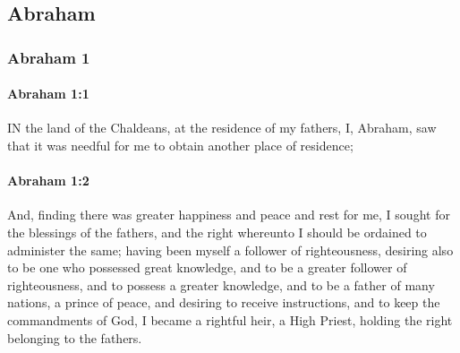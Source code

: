 \subsection{Abraham}
	\label{ABRAHAM}
	
	\subsubsection{Abraham 1} %
		\label{ABRAHAM-1}
		
		\paragraph{Abraham 1:1} %
			\label{ABRAHAM-1-1}

			IN the land of the Chaldeans, at the residence of my fathers, I, Abraham, saw that it was needful for me to obtain another place of residence;


		\paragraph{Abraham 1:2} %
			\label{ABRAHAM-1-2}

			And, finding there was greater happiness and peace and rest for me, I sought for the blessings of the fathers, and the right whereunto I should be ordained to administer the same; having been myself a follower of righteousness, desiring also to be one who possessed great knowledge, and to be a greater follower of righteousness, and to possess a greater knowledge, and to be a father of many nations, a prince of peace, and desiring to receive instructions, and to keep the commandments of God, I became a rightful heir, a High Priest, holding the right belonging to the fathers.

